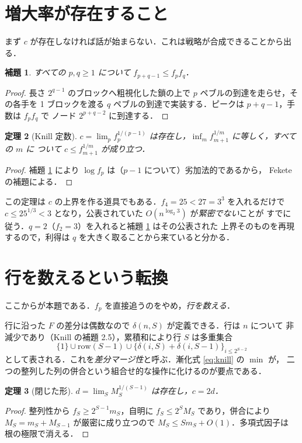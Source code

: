 \documentclass[a4paper,11pt]{jsarticle}
\newtheorem{theorem}{定理}
\newtheorem{lemma}[theorem]{補題}
\begin{document}
\section{増大率が存在すること}
まず $c$ が存在しなければ話が始まらない．これは戦略が合成できることから出る．

\begin{lemma}\label{lem:submult}
すべての $p, q \ge 1$ について $f_{p+q-1} \le f_p f_q$．
\end{lemma}
\begin{proof}
長さ $2^{q-1}$ のブロックへ粗視化した鎖の上で $p$ ペブルの到達を走らせ，その各手を
1 ブロックを渡る $q$ ペブルの到達で実装する．ピークは $p{+}q{-}1$，手数は $f_pf_q$ で
ノード $2^{p+q-2}$ に到達する．
\end{proof}

\begin{theorem}[Knill 定数]\label{thm:cbound}
$c = \lim_p f_p^{1/(p-1)}$ は存在し，$\inf_m f_{m+1}^{1/m}$ に等しく，すべての $m$ に
ついて $c \le f_{m+1}^{1/m}$ が成り立つ．
\end{theorem}
\begin{proof}
補題 \ref{lem:submult} により $\log f_p$ は（$p-1$ について）劣加法的であるから，
Fekete の補題による．
\end{proof}

この定理は $c$ の上界を作る道具でもある．$f_4 = 25 < 27 = 3^3$ を入れるだけで
$c \le 25^{1/3} < 3$ となり，公表されていた $O(n^{\log_2 3})$ が\emph{緊密でない}ことが
すでに従う．$q = 2$（$f_2 = 3$）を入れると補題 \ref{lem:submult} はその公表された
上界そのものを再現するので，利得は $q$ を大きく取ることから来ていると分かる．

\section{行を数えるという転換}
ここからが本題である．$f_p$ を直接追うのをやめ，\emph{行を数える}．

行に沿った $F$ の差分は偶数なので $\delta(n,S)$ が定義できる．行は $n$ について
非減少であり（Knill の補題 2.5），累積和により行 $S$ は多重集合
\[
\{1\} \cup \mathrm{row}(S{-}1) \cup \{\delta(i,S) + \delta(i,S{-}1)\}_{i \le 2^{S-2}}
\]
として表される．これを\emph{差分マージ性}と呼ぶ．漸化式 \eqref{eq:knill} の $\min$ が，
二つの整列した列の併合という組合せ的な操作に化けるのが要点である．

\begin{theorem}[閉じた形]\label{thm:2d}
$d = \lim_S M_S^{1/(S-1)}$ は存在し，$c = 2d$．
\end{theorem}
\begin{proof}
整列性から $f_S \ge 2^{S-1} m_S$，自明に $f_S \le 2^S M_S$ であり，併合により
$M_S = m_S + M_{S-1}$ が厳密に成り立つので $M_S \le S m_S + O(1)$．多項式因子は
根の極限で消える．
\end{proof}
\end{document}
